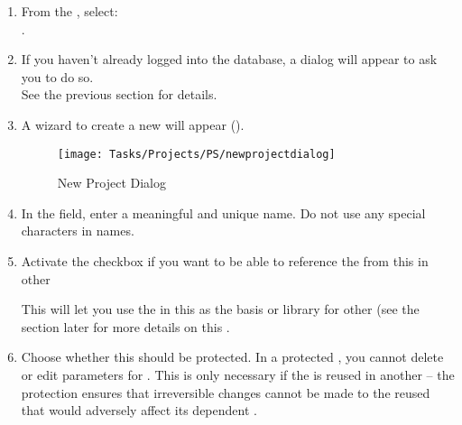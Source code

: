 

\begin{enumerate}
\item From the \gdclient{}, select:\\ 
.
\item If you haven't already logged into the database, a dialog will appear to ask you to do so.  \\
See the previous section  for details. 
 
\item A wizard to create a new \gdproject{} will appear  ().

\begin{figure}[h]
\begin{center}
\texttt{[image: Tasks/Projects/PS/newprojectdialog]}
\caption{New Project Dialog}
\label{projsettings}
\end{center}
\end{figure}

\item In the  field, enter a meaningful and unique \gdproject{} name.
 Do not use any special characters in \gdproject{} names. 


\item Activate the  checkbox if you want to be able to reference the \gdcases{} from this \gdproject{} in other \gdprojects{} 

This will let you use  the \gdcases{} in this \gdproject{} as the basis or library for other \gdprojects{}  (see the section later for more details on this . 

\item Choose whether this \gdproject{} should be protected. In a protected \gdprojects{}, you cannot delete \gdcases{} or edit parameters for \gdcases{}. This is only necessary if the \gdproject{} is reused in another \gdproject{} -- the protection ensures that irreversible changes cannot be made to the reused \gdproject{} that would adversely affect its dependent \gdprojects{}.


\end{enumerate}

